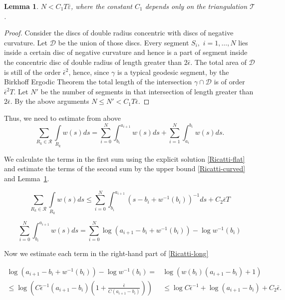 \documentclass[12pt]{article}
\numberwithin{equation}{section}
\newtheorem{lem}{Lemma}[section]
\theoremstyle{definition}
\newcommand{\eps}{\varepsilon}
\begin{document}
\begin{lem}\label{fakevisits} $N<C_1T\bar\eps$, where the constant $C_1$ depends only on the triangulation $\mathcal T$.
\end{lem}
\begin{proof} Consider the discs of double radius concentric with discs of negative curvature. Let $\mathcal D$ be the union of those discs. Every segment $S_i,\,\,i=1,\dots,N$ lies inside a certain  disc of negative curvature and hence is  a part of segment inside the  concentric disc of double radius of length  greater than $2\bar\epsilon$. The total area of $\mathcal D$ is still of the order $\bar\epsilon^2$, hence, since $\gamma$ is a typical geodesic segment, by the Birkhoff Ergodic Theorem  the total length of the intersection $\gamma\cap\mathcal D$  is of order $\bar\epsilon^2 T$. Let $N'$ be the number of segments in that intersection of length greater than $2\bar\epsilon$. By the above arguments  $N\le N'<C_1T\bar\epsilon$. 
\end{proof}

Thus, we need to estimate from above 
\begin{equation}\label{eq1}
 \sum\limits_{R_k\in\mathcal R}\int\limits_{R_k}w(s) ds =\sum_{i=0}^N \int_{b_i}^{a_{i+1}}w(s) ds+\sum_{i=1}^N \int_{a_i}^{b_i}w(s) ds.
\end{equation}

We calculate the terms in the first sum using the explicit solution \eqref{Ricatti-flat} and estimate the terms of the second sum by the upper bound \eqref{Ricatti-curved} and Lemma~\ref{fakevisits}.

\begin{equation}\label{Ricatti-estimate1}
\sum\limits_{R_k\in\mathcal R}\int\limits_{R_k} w(s) ds\leqslant\sum_{i=0}^N\int_{b_i}^{a_{i+1}}(s-b_i+w^{-1}(b_i))^{-1} ds+C_2\bar\epsilon T\end{equation}

\begin{equation}\label{Ricatti-long}
\sum_{i=0}^N\int_{b_i}^{a_{i+1}}w(s)ds=\sum_{i=0}^N\log (a_{i+1}-b_i+ w^{-1}(b_i))-\log w^{-1}(b_i)
\end{equation}

Now we estimate each term in the right-hand part of \eqref{Ricatti-long}

\begin{align}
\log (a_{i+1}-b_i+ w^{-1}(b_i))-\log w^{-1}(b_i)=&\log(w(b_i)(a_{i+1}-b_i)+1)\\\le\log\left(C\bar\epsilon^{-1}(a_{i+1}-b_i)\left(1+\frac{\bar\epsilon}{C(a_{i+1}-b_i)} \right)\right)&\le\log C\bar\epsilon^{-1}+\log(a_{i+1}-b_i)+C_2\bar\epsilon.\nonumber
\end{align}
\end{document}
